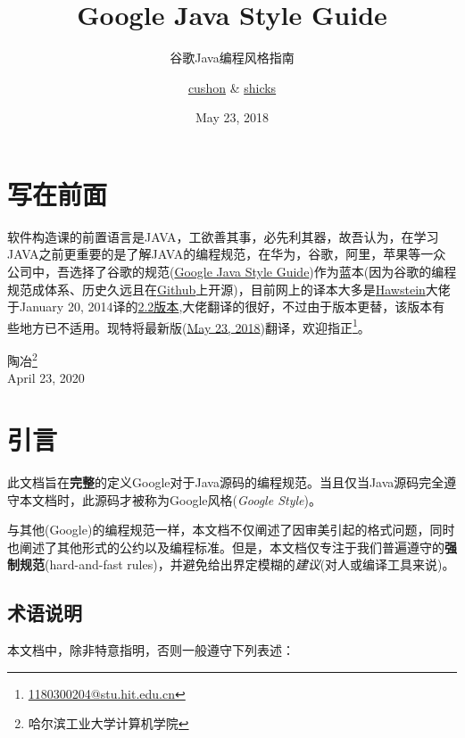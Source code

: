 \documentclass[cn,11pt,chinese]{elegantbook}
\title{Google Java Style Guide}
\subtitle{谷歌Java编程风格指南}
\author{\href{https://github.com/cushon}{cushon} \& \href{https://github.com/shicks}{shicks}}
\institute{\href{https://github.com/google/styleguide}{Google Style Guides Program}}
\date{May 23, 2018}
\begin{document}
\maketitle
\frontmatter

\chapter*{写在前面}

软件构造课的前置语言是JAVA，工欲善其事，必先利其器，故吾认为，在学习JAVA之前更重要的是了解JAVA的编程规范，在华为，谷歌，阿里，苹果等一众公司中，吾选择了谷歌的规范(\href{https://google.github.io/styleguide/javaguide.html}{Google Java Style Guide})作为蓝本(因为谷歌的编程规范成体系、历史久远且在\href{https://github.com/google/styleguide}{Github}上开源)，目前网上的译本大多是\href{http://hawstein.com/}{Hawstein}大佬于January 20, 2014译的\href{http://hawstein.com/2014/01/20/google-java-style/}{2.2版本},大佬翻译的很好，不过由于版本更替，该版本有些地方已不适用。现特将最新版(\href{https://google.github.io/styleguide/javaguide.html}{May 23, 2018})翻译，欢迎指正\footnote{\href{mailto:1180300204@stu.hit.edu.cn}{1180300204@stu.hit.edu.cn}}。

\vskip 1.5cm

\begin{flushright}
陶冶\footnote{哈尔滨工业大学\quad 计算机学院}\\
April 23, 2020
\end{flushright}

\tableofcontents

\mainmatter
\chapter{引言}
此文档旨在\textbf{完整}的定义Google对于Java源码的编程规范。当且仅当Java源码完全遵守本文档时，此源码才被称为Google风格(\emph{Google Style})。

与其他(Google)的编程规范一样，本文档不仅阐述了因审美引起的格式问题，同时也阐述了其他形式的公约以及编程标准。但是，本文档仅专注于我们普遍遵守的\textbf{强制规范}(hard-and-fast rules)，并避免给出界定模糊的\emph{建议}(对人或编译工具来说)。


\section{术语说明}

本文档中，除非特意指明，否则一般遵守下列表述：
\end{document}
